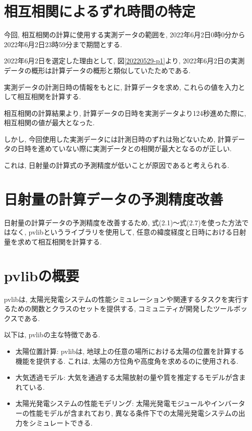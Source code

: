 
\section{相互相関によるずれ時間の特定}
今回, 相互相関の計算に使用する実測データの範囲を, 2022年6月2日0時0分から2022年6月2日23時59分まで期間とする.

2022年6月2日を選定した理由として, 図\ref{20220529-p1}より, 2022年6月2日の実測データの概形は計算データの概形と類似していたためである.

実測データの計測日時の情報をもとに, 計算データを求め, これらの値を入力として相互相関を計算する.

相互相関の計算結果より, 計算データの日時を実測データより124秒進めた際に, 相互相関の値が最大となった.

しかし, 今回使用した実測データには計測日時のずれは殆どないため, 計算データの日時を進めていない際に実測データとの相関が最大となるのが正しい.

これは, 日射量の計算式の予測精度が低いことが原因であると考えられる.

\section{日射量の計算データの予測精度改善}

日射量の計算データの予測精度を改善するため, 式(2.1)～式(2.7)を使った方法ではなく, pvlibというライブラリを使用して, 任意の緯度経度と日時における日射量を求めて相互相関を計算する.

\section{pvlibの概要}
pvlibは, 太陽光発電システムの性能シミュレーションや関連するタスクを実行するための関数とクラスのセットを提供する, コミュニティが開発したツールボックスである. 

以下は, pvlibの主な特徴である.

\begin{itemize}
  \item 太陽位置計算: pvlibは, 地球上の任意の場所における太陽の位置を計算する機能を提供する. これは, 太陽の方位角や高度角を求めるのに使用される. 
  \item 大気透過モデル: 大気を通過する太陽放射の量や質を推定するモデルが含まれている. 
  \item 太陽光発電システムの性能モデリング: 太陽光発電モジュールやインバーターの性能モデルが含まれており, 異なる条件下での太陽光発電システムの出力をシミュレートできる. 
\end{itemize}

